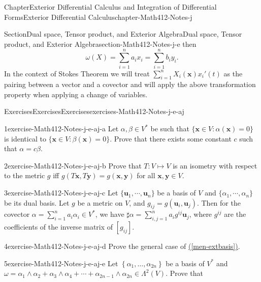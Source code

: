 \documentclass[oneside,10pt,]{book}
\newcommand{\xreffont}{\relax}
\numberwithin{equation}{section}
\newcommand{\bu}{\mathbf{u}}
\newcommand{\bx}{\mathbf{x}}
\newcommand{\by}{\mathbf{y}}
\begin{document}
\begin{chapterptx}{Chapter}{Exterior Differential Calculus and Integration of Differential Forms}{}{Exterior Differential Calculus}{}{}{chapter-Math412-Notes-j}
\begin{sectionptx}{Section}{Dual space, Tensor product, and Exterior Algebra}{}{Dual space, Tensor product, and Exterior Algebra}{}{}{section-Math412-Notes-j-e}
then%
\begin{equation*}
\omega (X) = \sum_{i=1}^{n} a_{i} x_{i}=\sum_{i=1}^{n} b_{i} y_{i}.
\end{equation*}
In the context of Stokes Theorem we will treat \(\sum_{i=1}^{n} X_{i}(\bx)x_{i}'(t)\) as the pairing between a vector and a covector  and will apply the above  transformation property when applying a change of variables.%
%
%
\typeout{************************************************}
\typeout{************************************************}
%
\begin{exercises-subsection-numberless}{Exercises}{Exercises}{}{Exercises}{}{}{exercises-Math412-Notes-j-e-aj}
\begin{divisionexercise}{1}{}{}{exercise-Math412-Notes-j-e-aj-a}%
Let \(\alpha, \beta\in V^{*}\) be such that \(\{\bx \in V: \alpha(\bx)=0\}\) is identical to \(\{\bx \in V: \beta(\bx)=0\}\). Prove that there exists some constant \(c\) such that \(\alpha =c\beta\).%
\end{divisionexercise}%
\begin{divisionexercise}{2}{}{}{exercise-Math412-Notes-j-e-aj-b}%
Prove that \(T:V\mapsto V\) is an isometry with respect to the metric \(g\) iff \(g(T\bx, T\by)=g(\bx, \by)\) for all \(\bx, \by \in V\).%
\end{divisionexercise}%
\begin{divisionexercise}{3}{}{}{exercise-Math412-Notes-j-e-aj-c}%
Let \(\{\bu_{1},\cdots, \bu_{n}\}\) be a basis of \(V\) and \(\{\alpha_{1},\cdots, \alpha_{n}\}\) be its dual basis. Let \(g\) be a metric on \(V\), and \(g_{ij}=g(\bu_{i},\bu_{j})\). Then for the covector \(\alpha=\sum_{i=1}^{n} a_{i} \alpha_{i}\in V^{*}\), we have \(\sharp \alpha= \sum_{i, j=1}^{n} a_{i} g^{ij}\bu_{j}\), where \(g^{ij}\) are the coefficients of the inverse matrix of \([g_{ij}]\).%
\end{divisionexercise}%
\begin{divisionexercise}{4}{}{}{exercise-Math412-Notes-j-e-aj-d}%
Prove the general case of \hyperref[men-extbasis]{({\xreffont\ref{men-extbasis}})}.%
\end{divisionexercise}%
\begin{divisionexercise}{5}{}{}{exercise-Math412-Notes-j-e-aj-e}%
Let \(\left\{\alpha_{1},\ldots, \alpha_{2n}\right\}\) be a basis of \(V^{*}\) and \(\omega=\alpha_{1} \wedge \alpha_{2}+\alpha_{3} \wedge \alpha_{4}+\cdots+
\alpha_{2n-1} \wedge \alpha_{2n} \in \Lambda^{2}(V)\). Prove that%
\begin{equation*}

\end{equation*}
\end{divisionexercise}
\end{exercises-subsection-numberless}
\end{sectionptx}
\end{chapterptx}
\end{document}
